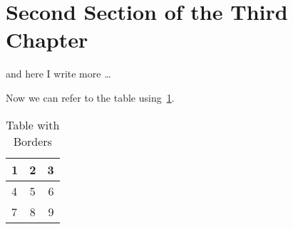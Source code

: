 \section{Second Section of the Third Chapter}
and here I write more \dots

Now we can refer to the table using~\cref{t:borders}.
\begin{table}[h]
\caption{Table with Borders}
\centering
\label{t:borders}
\begin{tabular}{|l|c| r|}

\hline
1 & 2 & 3 \\ \hline
4 & 5 & 6 \\ \hline
7 & 8 & 9 \\ \hline
\end{tabular}
\end{table}